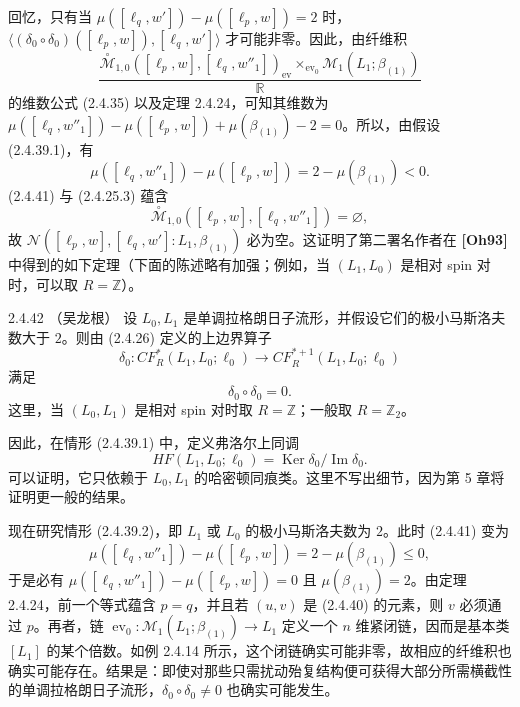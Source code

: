 回忆，只有当 $\mu([\ell_q,w'])-\mu([\ell_p,w])=2$ 时，
$\langle(\delta_0\circ\delta_0)([\ell_p,w]),[\ell_q,w']\rangle$ 才可能非零。因此，由纤维积
\begin{equation}
  \frac{
    \overset{\circ}{\mathcal M}_{1,0}
      ([\ell_p,w],[\ell_q,w''_1])_{\operatorname{ev}}
    \mathop{\times}_{\operatorname{ev}_0}
    \mathcal M_1(L_1;\beta_{(1)})}{\mathbb R}
  \tag{2.4.40}\label{eq:2-4-40}
\end{equation}
的维数公式 (2.4.35) 以及定理 2.4.24，可知其维数为
$\mu([\ell_q,w''_1])-\mu([\ell_p,w])+\mu(\beta_{(1)})-2=0$。所以，由假设 (2.4.39.1)，有
\begin{equation}
  \mu([\ell_q,w''_1])-\mu([\ell_p,w])
  =2-\mu(\beta_{(1)})<0.
  \tag{2.4.41}\label{eq:2-4-41}
\end{equation}
(2.4.41) 与 (2.4.25.3) 蕴含
\[
  \overset{\circ}{\mathcal M}_{1,0}
    ([\ell_p,w],[\ell_q,w''_1])=\varnothing,
\]
故 $\mathcal N([\ell_p,w],[\ell_q,w']:L_1,\beta_{(1)})$ 必为空。这证明了第二署名作者在 \textbf{[Oh93]} 中得到的如下定理（下面的陈述略有加强；例如，当 $(L_1,L_0)$ 是相对 spin 对时，可以取 $R=\mathbb Z$）。

\begin{theorem}{2.4.42}\label{thm:2-4-42}
\textup{（吴龙根）}\quad
设 $L_0,L_1$ 是单调拉格朗日子流形，并假设它们的极小马斯洛夫数大于 $2$。则由 (2.4.26) 定义的上边界算子
\[
  \delta_0:CF_R^*(L_1,L_0;\ell_0)
  \longrightarrow CF_R^{*+1}(L_1,L_0;\ell_0)
\]
满足
\[
  \delta_0\circ\delta_0=0.
\]
这里，当 $(L_0,L_1)$ 是相对 spin 对时取 $R=\mathbb Z$；一般取
$R=\mathbb Z_2$。
\end{theorem}

因此，在情形 (2.4.39.1) 中，定义弗洛尔上同调
\[
  HF(L_1,L_0;\ell_0)=\operatorname{Ker}\delta_0/
  \operatorname{Im}\delta_0.
\]
可以证明，它只依赖于 $L_0,L_1$ 的哈密顿同痕类。这里不写出细节，因为第 5 章将证明更一般的结果。

现在研究情形 (2.4.39.2)，即 $L_1$ 或 $L_0$ 的极小马斯洛夫数为 $2$。此时 (2.4.41) 变为
\[
  \mu([\ell_q,w''_1])-\mu([\ell_p,w])
  =2-\mu(\beta_{(1)})\leq0,
\]
于是必有
$\mu([\ell_q,w''_1])-\mu([\ell_p,w])=0$ 且
$\mu(\beta_{(1)})=2$。由定理 2.4.24，前一个等式蕴含 $p=q$，并且若
$(u,v)$ 是 (2.4.40) 的元素，则 $v$ 必须通过 $p$。再者，链
$\operatorname{ev}_0:\mathcal M_1(L_1;\beta_{(1)})\to L_1$ 定义一个 $n$ 维紧闭链，因而是基本类 $[L_1]$ 的某个倍数。如例 2.4.14 所示，这个闭链确实可能非零，故相应的纤维积也确实可能存在。结果是：即使对那些只需扰动殆复结构便可获得大部分所需横截性的单调拉格朗日子流形，$\delta_0\circ\delta_0\neq0$ 也确实可能发生。

